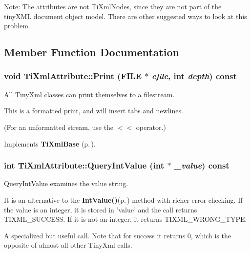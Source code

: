 \begin{Desc}
\item[Note:]The attributes are not Ti\-Xml\-Nodes, since they are not part of the tiny\-XML document object model. There are other suggested ways to look at this problem. \end{Desc}




\subsection{Member Function Documentation}
\subsubsection{\setlength{\rightskip}{0pt plus 5cm}void Ti\-Xml\-Attribute::Print (FILE $\ast$ {\em cfile}, int {\em depth}) const\hspace{0.3cm}{\tt  [virtual]}}\label{classTiXmlAttribute_TiXmlAttributea23}


All Tiny\-Xml classes can print themselves to a filestream. 

This is a formatted print, and will insert tabs and newlines.

(For an unformatted stream, use the $<$$<$ operator.)

Implements {\bf Ti\-Xml\-Base} {\rm (p.\,\pageref{classTiXmlBase_TiXmlNodea73})}.

\subsubsection{\setlength{\rightskip}{0pt plus 5cm}int Ti\-Xml\-Attribute::Query\-Int\-Value (int $\ast$ {\em \_\-value}) const}\label{classTiXmlAttribute_TiXmlAttributea7}


Query\-Int\-Value examines the value string. 

It is an alternative to the {\bf Int\-Value()}{\rm (p.\,\pageref{classTiXmlAttribute_TiXmlAttributea5})} method with richer error checking. If the value is an integer, it is stored in 'value' and the call returns TIXML\_\-SUCCESS. If it is not an integer, it returns TIXML\_\-WRONG\_\-TYPE.

A specialized but useful call. Note that for success it returns 0, which is the opposite of almost all other Tiny\-Xml calls.
